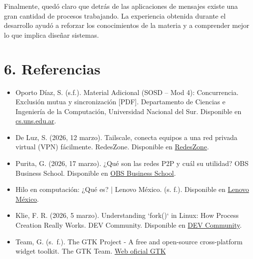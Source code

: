 \documentclass[12pt]{article}
\begin{document}
Finalmente, quedó claro que detrás de las aplicaciones de mensajes existe una gran cantidad de procesos trabajando. La experiencia obtenida durante el desarrollo ayudó a reforzar los conocimientos de la materia y a comprender mejor lo que implica diseñar sistemas.

\section{\large 6. Referencias}
\begin{itemize}
    \item Oporto Díaz, S. (s.f.). Material Adicional (SOSD – Mod 4): Concurrencia. Exclusión mutua y sincronización [PDF]. Departamento de Ciencias e Ingeniería de la Computación, Universidad Nacional del Sur. Disponible en \href{https://cs.uns.edu.ar/~gd/soyd/clases/04-SincronizacionExtras.pdf}{cs.uns.edu.ar}.
    
    \item De Luz, S. (2026, 12 marzo). Tailscale, conecta equipos a una red privada virtual (VPN) fácilmente. RedesZone. Disponible en \href{https://www.redeszone.net/tutoriales/vpn/configurar-tailscale-red-vpn-segura/}{RedesZone}.
    
    \item Purita, G. (2026, 17 marzo). ¿Qué son las redes P2P y cuál su utilidad? OBS Business School. Disponible en \href{https://www.obsbusiness.school/blog/que-son-las-redes-p2p-y-cual-su-utilidad}{OBS Business School}.
    
    \item Hilo en computación: ¿Qué es? | Lenovo México. (s. f.). Disponible en \href{https://www.lenovo.com/mx/es/glosario/hilo/?orgRef=https%253A%252F%252Fwww.google.com%252F}{Lenovo México}.
    
    \item Klie, F. R. (2026, 5 marzo). Understanding `fork()` in Linux: How Process Creation Really Works. DEV Community. Disponible en \href{https://dev-to.translate.goog/farhadrahimiklie/understanding-fork-in-linux-how-process-creation-really-works-13id?_x_tr_sl=en&_x_tr_tl=es&_x_tr_hl=es&_x_tr_pto=sge}{DEV Community}.
    \item Team, G. (s. f.). The GTK Project - A free and open-source cross-platform widget toolkit. The GTK Team. \href{https://www.gtk.org/}{Web oficial GTK}
\end{itemize}
\end{document}
